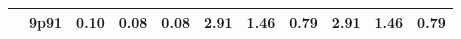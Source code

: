 \documentclass[12pt,A4paper]{article}
\begin{document}
\begin{table}[]
\begin{tabular}{lllllllllll}
\multicolumn{1}{|l|}{} & \multicolumn{1}{l|}{9p91} & \multicolumn{1}{c|}{0.10}        & \multicolumn{1}{c|}{0.08}         & \multicolumn{1}{c|}{0.08}        & \multicolumn{1}{c|}{2.91}         & \multicolumn{1}{c|}{1.46}        & \multicolumn{1}{c|}{0.79}        & \multicolumn{1}{c|}{2.91}        & \multicolumn{1}{c|}{1.46}        & \multicolumn{1}{c|}{0.79}         \\ \hline

\end{tabular}
\end{table}
\end{document}
